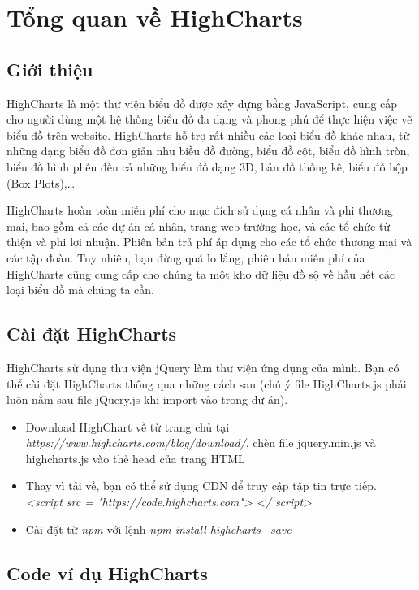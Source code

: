 \section{Tổng quan về HighCharts} 

\subsection{Giới thiệu}
HighCharts \cite{highcharts} là một thư viện biểu đồ được xây dựng bằng JavaScript, cung cấp cho người dùng một hệ thống biểu đồ đa dạng và phong phú để thực hiện việc vẽ biểu đồ trên website. HighCharts hỗ trợ rất nhiều các loại biểu đồ khác nhau, từ những dạng biểu đồ đơn giản như biều đồ đường, biểu đồ cột, biểu đồ hình tròn, biểu đồ hình phễu đến cả những biểu đồ dạng 3D, bản đồ thống kê, biểu đồ hộp (Box Plots),…

HighCharts hoàn toàn miễn phí cho mục đích sử dụng cá nhân và phi thương mại, bao gồm cả các dự án cá nhân, trang web trường học, và các tổ chức từ thiện và phi lợi nhuận. Phiên bản trả phí áp dụng cho các tổ chức thương mại và các tập đoàn. Tuy nhiên, bạn đừng quá lo lắng, phiên bản miễn phí của HighCharts cũng cung cấp cho chúng ta một kho dữ liệu đồ sộ về hầu hết các loại biểu đồ mà chúng ta cần.

\subsection{Cài đặt HighCharts}
HighCharts sử dụng thư viện jQuery làm thư viện ứng dụng của mình. Bạn có thể cài đặt HighCharts thông qua những cách sau (chú ý file HighCharts.js phải luôn nằm sau file jQuery.js khi import vào trong dự án).
\begin{itemize}
	\item Download HighChart về từ trang chủ tại {\it https://www.highcharts.com/blog/download/}, chèn file jquery.min.js và highcharts.js vào thẻ head của trang HTML
	\item Thay vì tải về, bạn có thể sử dụng CDN để truy cập tập tin trực tiếp. {\it <script src = "https://code.highcharts.com"> </ script>}
	\item Cài đặt từ {\it npm} với lệnh {\it npm install highcharts –save }
\end{itemize}

\subsection{Code ví dụ HighCharts}

